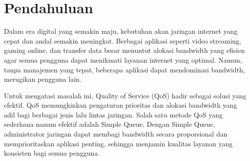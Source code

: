 \section*{Pendahuluan}

Dalam era digital yang semakin maju, kebutuhan akan jaringan internet yang cepat dan andal semakin meningkat. Berbagai aplikasi seperti video streaming, gaming online, dan transfer data besar menuntut alokasi bandwidth yang efisien agar semua pengguna dapat menikmati layanan internet yang optimal. Namun, tanpa manajemen yang tepat, beberapa aplikasi dapat mendominasi bandwidth, merugikan pengguna lain.

Untuk mengatasi masalah ini, Quality of Service (QoS) hadir sebagai solusi yang efektif. QoS memungkinkan pengaturan prioritas dan alokasi bandwidth yang adil bagi berbagai jenis lalu lintas jaringan. Salah satu metode QoS yang sederhana namun efektif adalah Simple Queue. Dengan Simple Queue, administrator jaringan dapat membagi bandwidth secara proporsional dan memprioritaskan aplikasi penting, sehingga menjamin kualitas layanan yang konsisten bagi semua pengguna.

